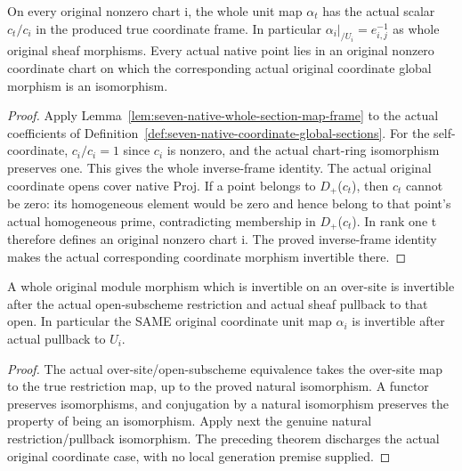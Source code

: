 \begin{theorem}
\label{thm:seven-native-coordinate-local-generators}
\leanok
On every original nonzero chart i, the whole unit map $\alpha_t$ has the
actual scalar $c_t/c_i$ in the produced true coordinate frame. In particular
$\alpha_{i}|_{/U_i}=e_{i,j}^{-1}$ as whole original sheaf morphisms.
Every actual native point lies in an original nonzero coordinate chart on
which the corresponding actual original coordinate global morphism is an
isomorphism.
\end{theorem}
\begin{proof}
Apply Lemma~\ref{lem:seven-native-whole-section-map-frame} to the actual
coefficients of Definition~\ref{def:seven-native-coordinate-global-sections}.
For the self-coordinate, $c_i/c_i=1$ since $c_i$ is nonzero, and the actual
chart-ring isomorphism preserves one. This gives the whole inverse-frame
identity. The actual original coordinate opens cover native Proj. If a
point belongs to $D_+$($c_t$), then $c_t$ cannot be zero: its homogeneous element
would be zero and hence belong to that point's actual homogeneous prime,
contradicting membership in $D_+$($c_t$). In rank one t therefore defines an
original nonzero chart i. The proved inverse-frame identity makes the
actual corresponding coordinate morphism invertible there.
\end{proof}

\begin{lemma}
\label{lem:seven-native-coordinate-pullback-generators}
\leanok
A whole original module morphism which is invertible on an over-site is
invertible after the actual open-subscheme restriction and actual sheaf
pullback to that open. In particular the SAME original coordinate unit
map $\alpha_i$ is invertible after actual pullback to $U_i$.
\end{lemma}
\begin{proof}
The actual over-site/open-subscheme equivalence takes the over-site map
to the true restriction map, up to the proved natural isomorphism. A functor
preserves isomorphisms, and conjugation by a natural isomorphism preserves
the property of being an isomorphism. Apply next the genuine natural
restriction/pullback isomorphism. The preceding theorem discharges the
actual original coordinate case, with no local generation premise supplied.
\end{proof}

